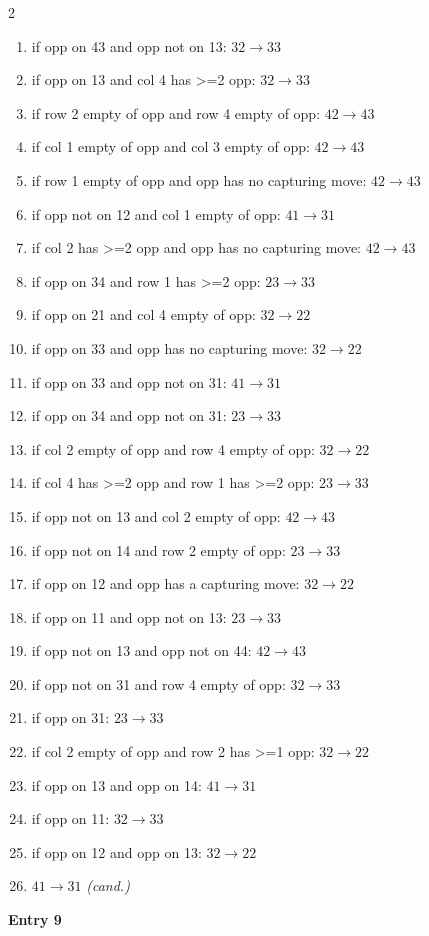 \begin{multicols}{2}
\begin{tikzpicture}[scale=0.24]
\end{tikzpicture}
\nopagebreak\begin{enumerate}[topsep=1pt,itemsep=0pt,parsep=0pt,leftmargin=2.2em,label=\arabic*.]
\item if opp on 43 and opp not on 13: $32\!\to\!33$
\item if opp on 13 and col 4 has >=2 opp: $32\!\to\!33$
\item if row 2 empty of opp and row 4 empty of opp: $42\!\to\!43$
\item if col 1 empty of opp and col 3 empty of opp: $42\!\to\!43$
\item if row 1 empty of opp and opp has no capturing move: $42\!\to\!43$
\item if opp not on 12 and col 1 empty of opp: $41\!\to\!31$
\item if col 2 has >=2 opp and opp has no capturing move: $42\!\to\!43$
\item if opp on 34 and row 1 has >=2 opp: $23\!\to\!33$
\item if opp on 21 and col 4 empty of opp: $32\!\to\!22$
\item if opp on 33 and opp has no capturing move: $32\!\to\!22$
\item if opp on 33 and opp not on 31: $41\!\to\!31$
\item if opp on 34 and opp not on 31: $23\!\to\!33$
\item if col 2 empty of opp and row 4 empty of opp: $32\!\to\!22$
\item if col 4 has >=2 opp and row 1 has >=2 opp: $23\!\to\!33$
\item if opp not on 13 and col 2 empty of opp: $42\!\to\!43$
\item if opp not on 14 and row 2 empty of opp: $23\!\to\!33$
\item if opp on 12 and opp has a capturing move: $32\!\to\!22$
\item if opp on 11 and opp not on 13: $23\!\to\!33$
\item if opp not on 13 and opp not on 44: $42\!\to\!43$
\item if opp not on 31 and row 4 empty of opp: $32\!\to\!33$
\item if opp on 31: $23\!\to\!33$
\item if col 2 empty of opp and row 2 has >=1 opp: $32\!\to\!22$
\item if opp on 13 and opp on 14: $41\!\to\!31$
\item if opp on 11: $32\!\to\!33$
\item if opp on 12 and opp on 13: $32\!\to\!22$
\item $41\!\to\!31$ \hfill\textit{(cand.)}
\end{enumerate}\smallskip
\noindent\textbf{Entry 9} \; 
\end{multicols}
